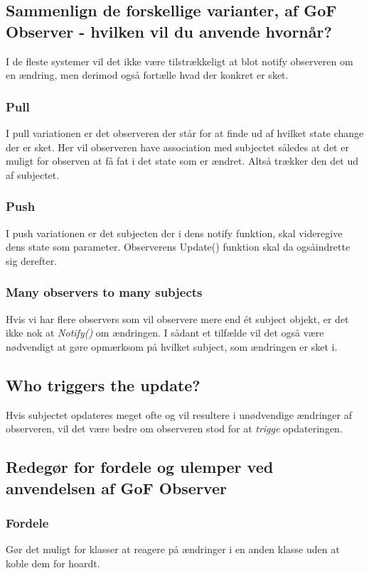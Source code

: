\subsection{Sammenlign de forskellige varianter, af GoF Observer - hvilken vil du anvende hvornår?}
I de fleste systemer vil det ikke være tilstrækkeligt at blot notify observeren om en ændring, men derimod også fortælle hvad der konkret er sket.

\subsubsection{Pull}
I pull variationen er det observeren der står for at finde ud af hvilket state change der er sket. Her vil observeren have association med subjectet således at det er muligt for observen at få fat i det state som er ændret. Altså trækker den det ud af subjectet.

\subsubsection{Push}
I push variationen er det subjecten der i dens notify funktion, skal videregive dens state som parameter. Observerens Update() funktion skal da ogsåindrette sig derefter. 

\subsubsection{Many observers to many subjects}
Hvis vi har flere observers som vil observere mere end ét subject objekt, er det ikke nok at \textit{Notify()} om ændringen. I sådant et tilfælde vil det også være nødvendigt at gøre opmærksom på hvilket subject, som ændringen er sket i.

\subsection{Who triggers the update?}
Hvis subjectet opdateres meget ofte og vil resultere i unødvendige ændringer af observeren, vil det være bedre om observeren stod for at \textit{trigge} opdateringen.

\subsection{Redegør for fordele og ulemper ved anvendelsen af GoF Observer}

\subsubsection{Fordele}
Gør det muligt for klasser at reagere på ændringer i en anden klasse uden at koble dem for hoardt.

